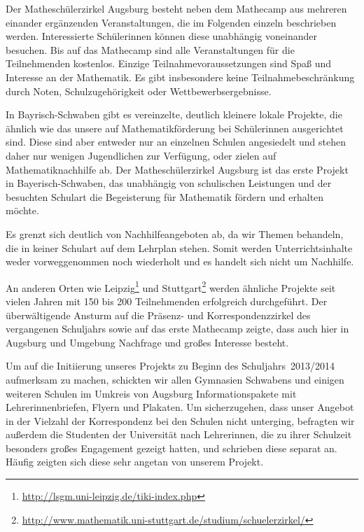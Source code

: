 \documentclass[12pt]{zettel}
\begin{document}
Der Matheschülerzirkel Augsburg besteht neben dem Mathecamp aus mehreren einander ergänzenden Veranstaltungen, die im
Folgenden einzeln beschrieben werden. Interessierte Schülerinnen
können diese unabhängig voneinander besuchen. Bis auf das Mathecamp sind alle
Veranstaltungen für die Teilnehmenden kostenlos. Einzige
Teilnahmevoraussetzungen sind Spaß und Interesse an der Mathematik. Es gibt
insbesondere keine Teilnahmebeschränkung durch Noten, Schulzugehörigkeit oder
Wettbewerbsergebnisse.

In Bayrisch-Schwaben gibt es vereinzelte, deutlich kleinere lokale
Projekte, die ähnlich wie das unsere auf Mathematikförderung bei Schülerinnen ausgerichtet sind. Diese sind aber entweder nur an einzelnen Schulen
angesiedelt und stehen daher nur wenigen Jugendlichen zur Verfügung, oder zielen
auf Mathematiknachhilfe ab. Der Matheschülerzirkel Augsburg ist das erste
Projekt in Bayerisch-Schwaben, das unabhängig von schulischen Leistungen und der besuchten Schulart die
Begeisterung für Mathematik fördern und erhalten möchte.

Es grenzt sich deutlich von Nachhilfeangeboten ab, da wir Themen behandeln, die in keiner Schulart auf dem Lehrplan stehen. Somit werden Unterrichtsinhalte weder
vorweggenommen noch wiederholt und es handelt sich nicht um Nachhilfe.

An anderen Orten wie Leipzig\footnote{\href{http://lsgm.uni-leipzig.de/tiki-index.php}{\textsf{http:/\!/lsgm.uni-leipzig.de/tiki-index.php}}} und
Stuttgart\footnote{\href{http://www.mathematik.uni-stuttgart.de/studium/schuelerzirkel/}{\textsf{http:/\!/www.mathematik.uni-stuttgart.de/studium/schuelerzirkel/}}}
werden ähnliche Projekte seit
vielen Jahren mit 150 bis 200 Teilnehmenden erfolgreich durchgeführt. Der überwältigende Ansturm auf die Präsenz- und Korrespondenzzirkel des vergangenen Schuljahrs sowie auf das
erste Mathecamp zeigte, dass auch hier in Augsburg und Umgebung Nachfrage und großes Interesse besteht.

Um auf die Initiierung unseres Projekts zu Beginn des Schuljahrs~2013/2014
aufmerksam zu machen, schickten wir allen Gymnasien Schwabens und einigen
weiteren Schulen im Umkreis von Augsburg Informationspakete mit Lehrerinnenbriefen,
Flyern und Plakaten. Um sicherzugehen, dass unser Angebot in der
Vielzahl der Korrespondenz bei den Schulen nicht unterging, befragten wir außerdem
die Studenten der Universität nach Lehrerinnen, die zu ihrer Schulzeit
besonders großes Engagement gezeigt hatten, und schrieben diese separat an.
Häufig zeigten sich diese sehr angetan von unserem Projekt.
\end{document}
